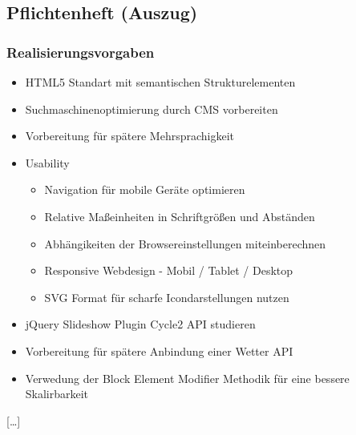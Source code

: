 \subsection{Pflichtenheft (Auszug)}
\label{app:Pflichtenheft}

\subsubsection*{Realisierungsvorgaben}

\begin{itemize}

\item HTML5 Standart mit semantischen Strukturelementen 
\item Suchmaschinenoptimierung durch CMS vorbereiten
\item Vorbereitung für spätere Mehrsprachigkeit
\item Usability 
  \begin{itemize}
    \item Navigation für mobile Geräte optimieren
  \item Relative Maßeinheiten in Schriftgrößen und Abständen
  \item Abhängikeiten der Browsereinstellungen miteinberechnen
  \item Responsive Webdesign - Mobil / Tablet / Desktop
  \item SVG Format für scharfe Icondarstellungen nutzen
  \end{itemize}
\item jQuery Slideshow Plugin Cycle2 API studieren
\item Vorbereitung für spätere Anbindung einer Wetter API
\item Verwedung der Block Element Modifier Methodik für eine bessere
Skalirbarkeit
\end{itemize}
[\ldots] 
\clearpage